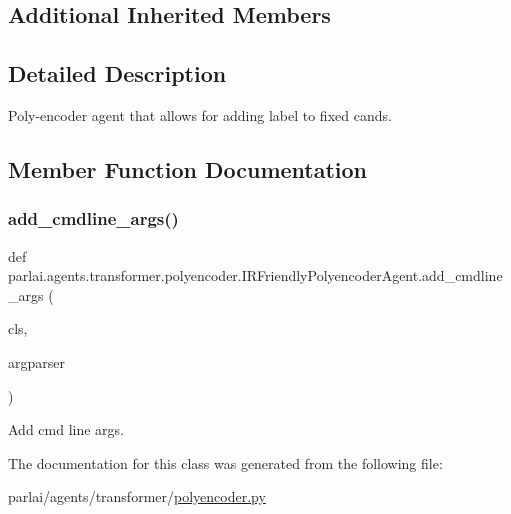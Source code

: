 \subsection*{Additional Inherited Members}


\subsection{Detailed Description}
\begin{DoxyVerb}Poly-encoder agent that allows for adding label to fixed cands.
\end{DoxyVerb}
 

\subsection{Member Function Documentation}
\mbox{\label{classparlai_1_1agents_1_1transformer_1_1polyencoder_1_1IRFriendlyPolyencoderAgent_afbf30376e853d1a5f9a52b1ae3453aa2}} 
\subsubsection{\texorpdfstring{add\+\_\+cmdline\+\_\+args()}{add\_cmdline\_args()}}
{\footnotesize\ttfamily def parlai.\+agents.\+transformer.\+polyencoder.\+I\+R\+Friendly\+Polyencoder\+Agent.\+add\+\_\+cmdline\+\_\+args (\begin{DoxyParamCaption}\item[{}]{cls,  }\item[{}]{argparser }\end{DoxyParamCaption})}

\begin{DoxyVerb}Add cmd line args.
\end{DoxyVerb}
 

The documentation for this class was generated from the following file\+:\begin{DoxyCompactItemize}
\item 
parlai/agents/transformer/\hyperlink{polyencoder_8py}{polyencoder.\+py}\end{DoxyCompactItemize}
